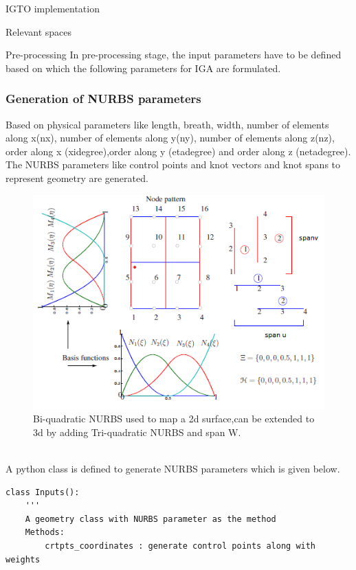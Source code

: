 \documentclass[a4paper,12pt,times]{article}
\begin{document}
\begin{section}{IGTO implementation}
\begin{subsection}{Relevant spaces}
\begin{enumerate}
\end{enumerate}

\end{subsection}

\begin{subsection}{Pre-processing}
In pre-processing stage, the input parameters have to be defined based on which the following parameters for IGA are formulated.

\subsubsection{Generation of NURBS parameters}
Based on physical parameters like length, breath, width, number of elements along x(nx), number of elements along y(ny), number of elements along z(nz), order along x (xidegree),order along y (etadegree) and order along z (netadegree). The NURBS parameters like control points and knot vectors and knot spans to represent geometry are generated. \\
\begin{figure}[h!]
\centering
\includegraphics[width=\linewidth]{assembly_figure.png}
\caption{ Bi-quadratic NURBS used to map a 2d surface,can be extended to 3d by adding Tri-quadratic NURBS and span W.\citep{NGUYEN201589}}
\label{fig:NURBS parameters figure}
\end{figure}
\\A python class is defined to generate NURBS parameters which is given below.
\begin{lstlisting}
class Inputs():
    '''
    A geometry class with NURBS parameter as the method
    Methods:
        crtpts_coordinates : generate control points along with weights 

\end{lstlisting}
\end{subsection}
\end{section}
\end{document}
